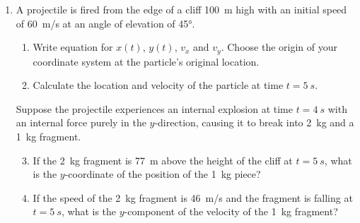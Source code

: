 \documentclass[12pt]{article}
\begin{document}
\begin{enumerate}[leftmargin=15pt]
\item A projectile is fired from the edge of a cliff \SI{100}{m} high with an
  initial speed of \SI{60}{m/s} at an angle of elevation of \ang{45}.
  \begin{enumerate}[noitemsep]
  \item Write equation for $x(t)$, $y(t)$, $v_x$ and $v_y$. Choose the origin of
    your coordinate system at the particle's original location.
  \item Calculate the location and velocity of the particle at time
    $t=\SI{5}{s}$.
  \end{enumerate}
  Suppose the projectile experiences an internal explosion at time $t=\SI{4}{s}$
  with an internal force purely in the $y$-direction, causing it to break into
  \SI{2}{\kg} and a \SI{1}{\kg} fragment.
  \begin{enumerate}[noitemsep]
    \setcounter{enumii}{2}

  \item If the \SI{2}{\kg} fragment is \SI{77}{m} above the height of the
    cliff at $t=\SI{5}{s}$, what is the $y$-coordinate of the position of the
    \SI{1}{\kg} piece?
  \item If the speed of the \SI{2}{kg} fragment is \SI{46}{m/s} and the
    fragment is falling at $t=\SI{5}{s}$, what is the $y$-component of the
    velocity of the \SI{1}{kg} fragment?
  \end{enumerate}


\end{enumerate}
\end{document}
